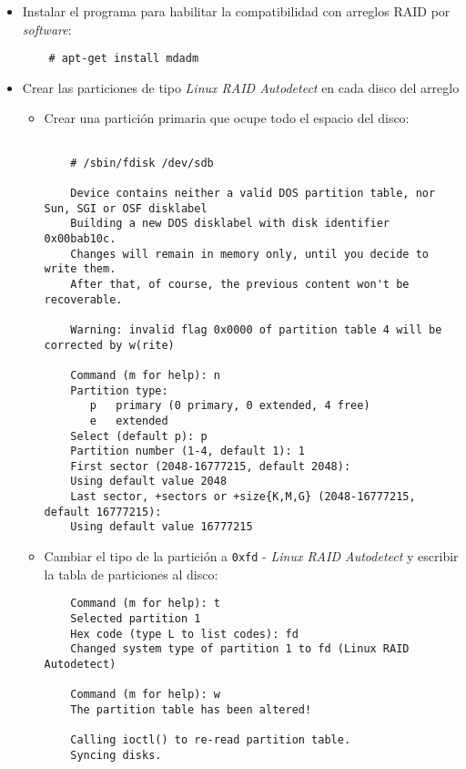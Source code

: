 \begin{itemize}
  \item Instalar el programa para habilitar la compatibilidad con arreglos \textsc{RAID} por \textit{software}:

{
\scriptsize
\linespread{1}
\begin{verbatim}
    # apt-get install mdadm
\end{verbatim}
}

  \item Crear las particiones de tipo \textit{Linux RAID Autodetect} en cada disco del arreglo
    \begin{itemize}
      \item Crear una partici\'{o}n primaria que ocupe todo el espacio del disco:

{
\scriptsize
\linespread{1}
\begin{verbatim}

    # /sbin/fdisk /dev/sdb

    Device contains neither a valid DOS partition table, nor Sun, SGI or OSF disklabel
    Building a new DOS disklabel with disk identifier 0x00bab10c.
    Changes will remain in memory only, until you decide to write them.
    After that, of course, the previous content won't be recoverable.

    Warning: invalid flag 0x0000 of partition table 4 will be corrected by w(rite)

    Command (m for help): n
    Partition type:
       p   primary (0 primary, 0 extended, 4 free)
       e   extended
    Select (default p): p
    Partition number (1-4, default 1): 1
    First sector (2048-16777215, default 2048):
    Using default value 2048
    Last sector, +sectors or +size{K,M,G} (2048-16777215, default 16777215):
    Using default value 16777215
\end{verbatim}
}

      \item Cambiar el tipo de la partici\'{o}n a \texttt{0xfd} - \textit{Linux RAID Autodetect} y escribir la tabla de particiones al disco:

{
\scriptsize
\linespread{1}
\begin{verbatim}
    Command (m for help): t
    Selected partition 1
    Hex code (type L to list codes): fd
    Changed system type of partition 1 to fd (Linux RAID Autodetect)

    Command (m for help): w
    The partition table has been altered!

    Calling ioctl() to re-read partition table.
    Syncing disks.
\end{verbatim}
}


\end{itemize}
\end{itemize}
